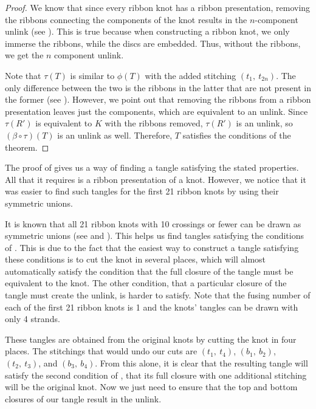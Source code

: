 \begin{paper}
\begin{proof}
We know that since every ribbon knot has a ribbon presentation, removing the
ribbons connecting the components of the knot results in the $n$-component
unlink (see \figPresentation).
This is true because when constructing a ribbon knot, we only immerse the
ribbons, while the discs are embedded.
Thus, without the ribbons, we get the $n$ component unlink.

Note that $\tau(T)$ is similar to $\phi(T)$ with the added stitching
$(t_1,~t_{2n})$.
The only difference between the two is the ribbons in the latter that are not
present in the former (see \figFinal).
However, we point out that removing the ribbons from a ribbon presentation
leaves just the components, which are equivalent to an unlink.
Since $\tau(R')$ is equivalent to $K$ with the ribbons removed, $\tau(R')$ is an
unlink, so $(\beta\circ\tau)(T)$ is an unlink as well.
Therefore, $T$ satisfies the conditions of the theorem.
\end{proof}


The proof of \thmRibbon gives us a way of finding a tangle satisfying the stated
properties.
All that it requires is a ribbon presentation of a knot.
However, we notice that it was easier to find such tangles for the first 21
ribbon knots by using their symmetric unions.

It is known that all 21 ribbon knots with 10 crossings or fewer can be drawn as
symmetric unions (see \cite{many} and \cite{one}).
This helps us find tangles satisfying the conditions of \thmRibbon.
This is due to the fact that the easiest way to construct a tangle satisfying
these conditions is to cut the knot in several places, which will almost
automatically satisfy the condition that the full closure of the tangle must be
equivalent to the knot.
The other condition, that a particular closure of the tangle must create the
unlink, is harder to satisfy.
Note that the fusing number of each of the first 21 ribbon knots is 1 and the
knots' tangles can be drawn with only 4 strands.

These tangles are obtained from the original knots by cutting the knot in four
places.
The stitchings that would undo our cuts are $(t_1,~t_4)$, $(b_1,~b_2)$,
$(t_2,~t_3)$, and $(b_3,~b_4)$.
From this alone, it is clear that the resulting tangle will satisfy the second
condition of \thmRibbon, that its full closure with one additional stitching
will be the original knot.
Now we just need to ensure that the top and bottom closures of our tangle
result in the unlink.


\end{paper}
